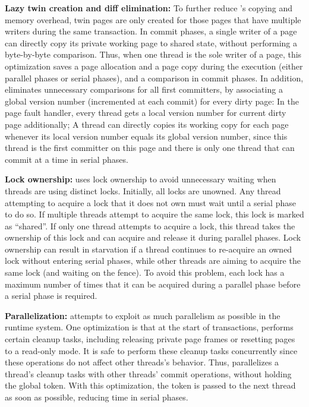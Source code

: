 \textbf{Lazy twin creation and diff elimination: }
To further reduce \dthreads{}'s copying and memory overhead, twin pages are only created for those pages that have multiple writers during the same transaction. In commit phases, a single writer of a page can directly copy its private working page to shared state, without performing a byte-by-byte comparison. Thus, when one thread is the sole writer of a page, this optimization saves a page allocation and a page copy during the execution (either parallel phases or serial phases), and a comparison in commit phases.
In addition, \dthreads{} eliminates unnecessary comparisons for all first committers, by associating a global version number (incremented at each commit) for every dirty page: In the page fault handler, every thread gets a local version number for current dirty page additionally; A thread can directly copies its working copy for each page whenever its local version number equals its global version number, since this thread is the first committer on this page and there is only one thread that can commit at a time in serial phases.  

\textbf{Lock ownership:} \dthreads{} uses lock ownership to avoid unnecessary waiting when threads are using distinct locks. Initially, all locks are unowned. Any thread attempting to acquire a lock that it does not own must wait until a serial phase to do so. If multiple threads attempt to acquire the same lock, this lock is marked as ``shared''. If only one thread attempts to acquire a lock, this thread takes the ownership of this lock and can acquire and release it during parallel phases. Lock ownership can result in starvation if a thread continues to re-acquire an owned lock without entering serial phases, while other threads are aiming to acquire the same lock (and waiting on the fence). To avoid this problem, each lock has a maximum number of times that it can be acquired during a parallel phase before a serial phase is required.

\textbf{Parallelization: }
\dthreads{} attempts to exploit as much parallelism as possible in the runtime system. One optimization is that at the start of transactions, \dthreads{} performs certain cleanup tasks, including releasing private page frames or resetting pages to a read-only mode. It is safe to perform these cleanup tasks concurrently since these operations do not affect other threads's behavior.
Thus, \dthreads{} parallelizes a thread's cleanup tasks with other threads’ commit operations, without holding the global token. With this optimization, the token is passed to the next thread as soon as possible, reducing time in serial phases. 